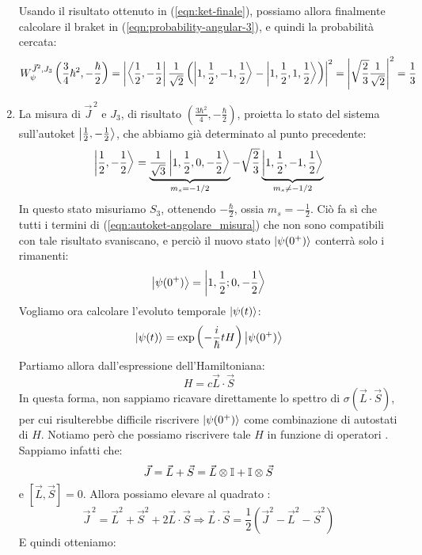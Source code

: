\documentclass[../../FisicaTeorica.tex]{subfiles}
\begin{document}
\begin{enumerate}
Usando il risultato ottenuto in (\ref{eqn:ket-finale}), possiamo allora finalmente calcolare il braket in (\ref{eqn:probability-angular-3}),  e quindi la probabilità cercata:
\begin{align*}
W_\psi^{\vec{J}^2, J_3}\left(\frac{3}{4}\hbar^2, -\frac{\hbar}{2}\right)  =\left|\Bra{\frac{1}{2},-\frac{1}{2}}\frac{1}{\sqrt{2}}\left(\Ket{1,\frac{1}{2},-1,\frac{1}{2}}-\Ket{1,\frac{1}{2},1,\frac{1}{2}}\right)\right|^2 =
\left|\sqrt{\frac{2}{3}}\frac{1}{\sqrt{2}} \right|^2=\frac{1}{3}
\end{align*}
\item La misura di $\vec{J}^{\,2}$ e $J_3$, di risultato $\left(\frac{3\hbar^2}{4},-\frac{\hbar}{2}\right)$, proietta lo stato del sistema sull'autoket $\Ket{\frac{1}{2},-\frac{1}{2}}$, che abbiamo già determinato al punto precedente:
\begin{align}
\Ket{\frac{1}{2},-\frac{1}{2}}=\underbrace{\frac{1}{\sqrt{3}}\Ket{1,\frac{1}{2},0,-\frac{1}{2}}}_{m_s=-1/2}-\sqrt{\frac{2}{3}}\underbrace{\Ket{1,\frac{1}{2},-1, \frac{1}{2}}}_{m_s \neq -1/2}
\label{eqn:autoket-angolare_misura}
\end{align}
In questo stato misuriamo $S_3$, ottenendo $-\frac{\hbar}{2}$, ossia $m_s = -\frac{1}{2}$. Ciò fa sì che tutti i termini di (\ref{eqn:autoket-angolare_misura}) che non sono compatibili con tale risultato svaniscano, e perciò il nuovo stato $\Ket{\psi(0^+)}$ conterrà solo i rimanenti:
\[
\Ket{\psi(0^+)}=\Ket{1,\frac{1}{2};0,-\frac{1}{2}}
\]
Vogliamo ora calcolare l'evoluto temporale $\Ket{\psi(t)}$:
\begin{align}
\Ket{\psi(t)}=\exp\left(-\frac{i}{\hbar}tH\right)\Ket{\psi(0^+)}
\label{eqn:evoluto-temporale-angolare}
\end{align}
Partiamo allora dall'espressione dell'Hamiltoniana:
\[
H=c\vec{L}\cdot \vec{S}
\]
In questa forma, non sappiamo ricavare direttamente lo spettro di $\sigma(\vec{L}\cdot \vec{S})$, per cui risulterebbe difficile riscrivere $\Ket{\psi(0^+)}$ come combinazione di autostati di $H$. Notiamo però che possiamo riscrivere tale $H$ in funzione di operatori .\\
Sappiamo infatti che:
\[
\vec{J}=\vec{L}+\vec{S} = \vec{L}\otimes \mathbb{I} + \mathbb{I}\otimes \vec{S}
\]
e $[\vec{L},\vec{S}]=0$. Allora possiamo elevare al quadrato :
\[
\vec{J}^{\,2} = \vec{L}^{2} + \vec{S}^2 + 2\vec{L}\cdot \vec{S} \Rightarrow  \vec{L}\cdot\vec{S} = \frac{1}{2}\left(\vec{J}^2 - \vec{L}^2 -\vec{S}^2 \right)
\]
E quindi otteniamo:
\begin{align*}

\end{align*}
\end{enumerate}
\end{document}
